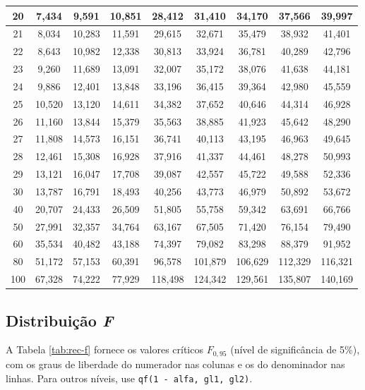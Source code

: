 \documentclass[
]{book}
\begin{document}
\begin{table}
{\begin{tabular}[t]{c|c|c|c|c|c|c|c|c}
\hline
20 & 7,434 & 9,591 & 10,851 & 28,412 & 31,410 & 34,170 & 37,566 & 39,997\\
\hline
21 & 8,034 & 10,283 & 11,591 & 29,615 & 32,671 & 35,479 & 38,932 & 41,401\\
\hline
22 & 8,643 & 10,982 & 12,338 & 30,813 & 33,924 & 36,781 & 40,289 & 42,796\\
\hline
23 & 9,260 & 11,689 & 13,091 & 32,007 & 35,172 & 38,076 & 41,638 & 44,181\\
\hline
24 & 9,886 & 12,401 & 13,848 & 33,196 & 36,415 & 39,364 & 42,980 & 45,559\\
\hline
25 & 10,520 & 13,120 & 14,611 & 34,382 & 37,652 & 40,646 & 44,314 & 46,928\\
\hline
26 & 11,160 & 13,844 & 15,379 & 35,563 & 38,885 & 41,923 & 45,642 & 48,290\\
\hline
27 & 11,808 & 14,573 & 16,151 & 36,741 & 40,113 & 43,195 & 46,963 & 49,645\\
\hline
28 & 12,461 & 15,308 & 16,928 & 37,916 & 41,337 & 44,461 & 48,278 & 50,993\\
\hline
29 & 13,121 & 16,047 & 17,708 & 39,087 & 42,557 & 45,722 & 49,588 & 52,336\\
\hline
30 & 13,787 & 16,791 & 18,493 & 40,256 & 43,773 & 46,979 & 50,892 & 53,672\\
\hline
40 & 20,707 & 24,433 & 26,509 & 51,805 & 55,758 & 59,342 & 63,691 & 66,766\\
\hline
50 & 27,991 & 32,357 & 34,764 & 63,167 & 67,505 & 71,420 & 76,154 & 79,490\\
\hline
60 & 35,534 & 40,482 & 43,188 & 74,397 & 79,082 & 83,298 & 88,379 & 91,952\\
\hline
80 & 51,172 & 57,153 & 60,391 & 96,578 & 101,879 & 106,629 & 112,329 & 116,321\\
\hline
100 & 67,328 & 74,222 & 77,929 & 118,498 & 124,342 & 129,561 & 135,807 & 140,169\\
\hline
\end{tabular}}
\end{table}

\subsection{\texorpdfstring{Distribuição \emph{F}}{Distribuição F}}\label{distribuiuxe7uxe3o-f}

A Tabela \ref{tab:rec-f} fornece os valores críticos \(F_{0{,}95}\) (nível de significância de 5\%), com os graus de liberdade do numerador nas colunas e os do denominador nas linhas. Para outros níveis, use \texttt{qf(1\ -\ alfa,\ gl1,\ gl2)}.
\end{document}
